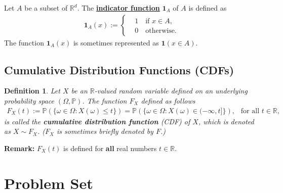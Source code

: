 \documentclass[11pt,letterpaper, leqno]{article}
\newtheorem{definition}{Definition}
\numberwithin{equation}{section}
\numberwithin{theorem}{section}
\numberwithin{lemma}{section}
\numberwithin{corollary}{section}
\numberwithin{definition}{section}
\numberwithin{proposition}{section}
\numberwithin{remark}{section}
\numberwithin{example}{section}
\begin{document}
Let $A$ be a subset of $\mathbb{R}^d$. The \textbf{\href{https://en.wikipedia.org/wiki/Indicator_function}{indicator function}} $\mathbf{1}_A$ of $A$ is defined as
\begin{align}\label{eq: definition of indicator functions}
\mathbf{1}_A(x):=\left\{
\begin{aligned}
& 1\ \ \ \text{ if }x\in A,\\
& 0\ \ \ \text{ otherwise.}
\end{aligned}
\right.
\end{align}
The function $\mathbf{1}_A(x)$ is sometimes represented as $\mathbf{1}(x\in A)$.

\subsection{Cumulative Distribution Functions (CDFs)}

\begin{definition}\label{def: CDF}
Let $X$ be an $\mathbb{R}$-valued random variable defined on an underlying probability space $(\Omega,\mathbb{P})$. The function $F_X$ defined as follows 
\begin{align}\label{eq: def of CDFs}
    F_X(t):=\mathbb{P}\left(\{\omega\in\Omega: X(\omega)\le t\} \right)=\mathbb{P}\left(\{\omega\in\Omega: X(\omega)\in(-\infty, t]\}\right),\ \ \mbox{ for all }t\in\mathbb{R},
\end{align}
is called the \textbf{cumulative distribution function} (CDF) of $X$, which is denoted as $X\sim F_X$. ($F_X$ is sometimes briefly denoted by $F$.)
\end{definition}
\noindent\textbf{Remark:} $F_X(t)$ is defined for \textbf{all} real numbers $t\in\mathbb{R}$.


\newpage
\section{Problem Set}
\end{document}
